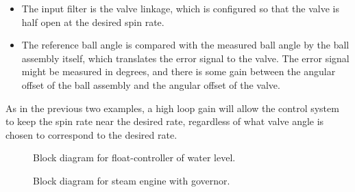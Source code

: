 \begin{enumerate}[(a)]
\begin{itemize}
         \item The input filter is the valve linkage, which is configured so
            that the valve is half open at the desired spin rate.
         \item The reference ball angle is compared with the measured ball
            angle by the ball assembly itself, which translates the error
            signal to the valve. The error signal might be measured in degrees,
            and there is some gain between the angular offset of the ball
            assembly and the angular offset of the valve.
      \end{itemize}
      As in the previous two examples, a high loop gain will allow the control
      system to keep the spin rate near the desired rate, regardless of what
      valve angle is chosen to correspond to the desired rate.
\end{enumerate}
\begin{figure}
   \begin{center}
      \begin{small}
         
      \end{small}
      \caption{Block diagram for float-controller of water level.}
      \label{fig:float-valve}
   \end{center}
\end{figure}
\begin{figure}
   \begin{center}
      \begin{small}
         
      \end{small}
      \caption{Block diagram for steam engine with governor.}
      \label{fig:steam-engine}
   \end{center}
\end{figure}

